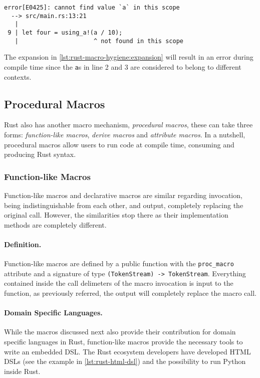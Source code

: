 \begin{listing}
    \begin{verbatim}
error[E0425]: cannot find value `a` in this scope
  --> src/main.rs:13:21
   |
 9 | let four = using_a!(a / 10);
   |                     ^ not found in this scope
    \end{verbatim}
    \caption{
        The expansion in \autoref{lst:rust-macro-hygiene:expansion} will result in an error during compile time
        since the \texttt{a}s in line 2 and 3 are considered to belong to different contexts.
    }
    \label{lst:rust-macro-hygiene:error}
\end{listing}

\subsection{Procedural Macros}\label{sec:rust-macros:proc}
Rust also has another macro mechanism, \emph{procedural macros},
these can take three forms: \emph{function-like macros}, \emph{derive macros} and \emph{attribute macros}.
In a nutshell, procedural macros allow users to run code at compile time, consuming and producing Rust syntax.

\subsubsection*{Function-like Macros}
Function-like macros and declarative macros are similar regarding invocation, being indistinguishable from each other,
and output, completely replacing the original call.
However, the similarities stop there as their implementation methods are completely different.

\paragraph{Definition.}
Function-like macros are defined by a public function with the \texttt{proc\_macro} attribute and
a signature of type \texttt{(TokenStream) -> TokenStream}.
Everything contained inside the call delimeters of the macro invocation is input to the function,
as previously referred, the output will completely replace the macro call.

\paragraph{Domain Specific Languages.}
While the macros discussed next also provide their contribution for domain specific languages in Rust,
function-like macros provide the necessary tools to write an embedded DSL.
The Rust ecosystem developers have developed HTML DSLs \autocite{Wong2021, Stokke2021}
(see the example in \autoref{lst:rust-html-dsl}) and
the possibility to run Python inside Rust\autocite{Fusion2021}.

